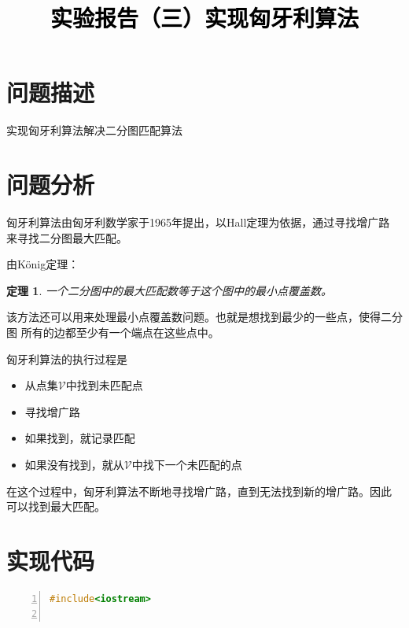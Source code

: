 \documentclass[a4paper,twoside]{article}
\newtheorem{theorem}{定理}
\newcommand{\PaperTitle}{实验报告（三）实现匈牙利算法}  %
\begin{document}
\newpage

\title{
	\Large{\textcolor{black}{\PaperTitle}}
}
	
	
\maketitle
	
\tableofcontents
 
\newpage
\begin{spacing}{1.2}

\section{问题描述}

实现匈牙利算法解决二分图匹配算法

\section{问题分析}

匈牙利算法由匈牙利数学家于1965年提出，以Hall定理为依据，通过寻找增广路
来寻找二分图最大匹配。

由König定理：
\begin{theorem}
	一个二分图中的最大匹配数等于这个图中的最小点覆盖数。
\end{theorem}
该方法还可以用来处理最小点覆盖数问题。也就是想找到最少的一些点，使得二分图
所有的边都至少有一个端点在这些点中。

匈牙利算法的执行过程是

\begin{itemize}
	\item 从点集$\mathcal{V}$中找到未匹配点
	\item 寻找增广路
	\item 如果找到，就记录匹配
	\item 如果没有找到，就从$\mathcal{V}$中找下一个未匹配的点
\end{itemize}
	
在这个过程中，匈牙利算法不断地寻找增广路，直到无法找到新的增广路。因此
可以找到最大匹配。

\appendix
\section{实现代码}

\begin{lstlisting}[language=c++,numbers=left,style=CppStyle,caption=红包发放,label={code:redpacket}]
#include<iostream>


\end{lstlisting}
\end{spacing}
\end{document}
